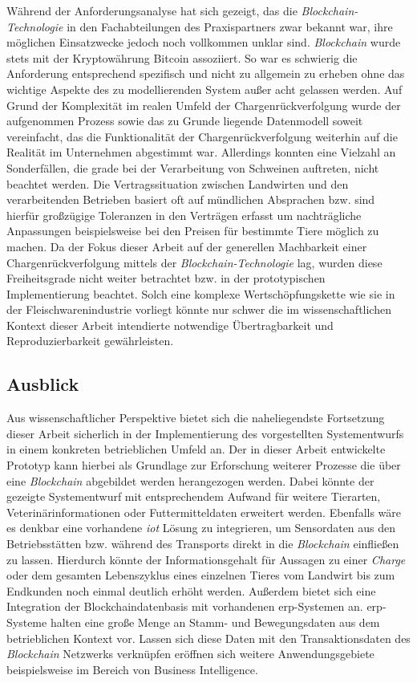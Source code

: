Während der Anforderungsanalyse hat sich gezeigt, das die \textit{Blockchain-Technologie} in den Fachabteilungen des Praxispartners zwar bekannt war, ihre möglichen Einsatzwecke jedoch noch vollkommen unklar sind. \textit{Blockchain} wurde stets mit der Kryptowährung Bitcoin assoziiert. So war es schwierig die Anforderung entsprechend spezifisch und nicht zu allgemein zu erheben ohne das wichtige Aspekte des zu modellierenden System außer acht gelassen werden. Auf Grund der Komplexität im realen Umfeld der Chargenrückverfolgung wurde der aufgenommen Prozess sowie das zu Grunde liegende Datenmodell soweit vereinfacht, das die Funktionalität der Chargenrückverfolgung weiterhin auf die Realität im Unternehmen abgestimmt war. Allerdings konnten eine Vielzahl an Sonderfällen, die grade bei der Verarbeitung von Schweinen auftreten, nicht beachtet werden. Die Vertragssituation zwischen Landwirten und den verarbeitenden Betrieben basiert oft auf mündlichen Absprachen bzw. sind hierfür großzügige Toleranzen in den Verträgen erfasst um nachträgliche Anpassungen beispielsweise bei den Preisen für bestimmte Tiere möglich zu machen. Da der Fokus dieser Arbeit auf der generellen Machbarkeit einer Chargenrückverfolgung mittels der \textit{Blockchain-Technologie} lag, wurden diese Freiheitsgrade nicht weiter betrachtet bzw. in der prototypischen Implementierung beachtet. Solch eine komplexe Wertschöpfungskette wie sie in der Fleischwarenindustrie vorliegt könnte nur schwer die im wissenschaftlichen Kontext dieser Arbeit intendierte notwendige Übertragbarkeit und Reproduzierbarkeit gewährleisten.

\subsection{Ausblick}

Aus wissenschaftlicher Perspektive bietet sich die naheliegendste Fortsetzung dieser Arbeit sicherlich in der Implementierung des vorgestellten Systementwurfs in einem konkreten betrieblichen Umfeld an. Der in dieser Arbeit entwickelte Prototyp kann hierbei als Grundlage zur Erforschung weiterer Prozesse die über eine \textit{Blockchain} abgebildet werden herangezogen werden. Dabei könnte der gezeigte Systementwurf mit entsprechendem Aufwand für weitere Tierarten, Veterinärinformationen oder Futtermitteldaten erweitert werden. Ebenfalls wäre es denkbar eine vorhandene \textit{\acf{iot}} Lösung zu integrieren, um Sensordaten aus den Betriebsstätten bzw. während des Transports direkt in die \textit{Blockchain} einfließen zu lassen. Hierdurch könnte der Informationsgehalt für Aussagen zu einer \textit{Charge} oder dem gesamten Lebenszyklus eines einzelnen Tieres vom Landwirt bis zum Endkunden noch einmal deutlich erhöht werden. Außerdem bietet sich eine Integration der Blockchaindatenbasis mit vorhandenen \ac{erp}-Systemen an. \ac{erp}-Systeme halten eine große Menge an Stamm- und Bewegungsdaten aus dem betrieblichen Kontext vor. Lassen sich diese Daten mit den Transaktionsdaten des \textit{Blockchain} Netzwerks verknüpfen eröffnen sich weitere Anwendungsgebiete beispielsweise im Bereich von Business Intelligence.

\newpage
